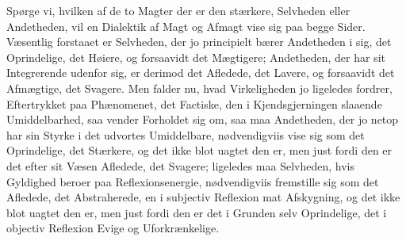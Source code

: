 \documentclass[12pt,a4paper]{book}
\begin{document}
Spørge vi, hvilken af de to Magter der er den stærkere, Selvheden eller
Andetheden, vil en Dialektik af Magt og Afmagt vise sig paa begge Sider.
Væsentlig forstaaet er Selvheden, der jo principielt bærer Andetheden i sig, det
Oprindelige, det Høiere, og forsaavidt det Mægtigere; Andetheden, der har
sit Integrerende udenfor sig, er derimod det Afledede, det Lavere, og forsaavidt
det Afmægtige, det Svagere. Men falder nu, hvad Virkeligheden jo ligeledes
fordrer, Eftertrykket paa Phænomenet, det Factiske, den i Kjendsgjerningen
slaaende Umiddelbarhed, saa vender Forholdet sig om, saa maa Andetheden, der jo
netop har sin Styrke i det udvortes Umiddelbare, nødvendigviis vise sig som det
Oprindelige, det Stærkere, og det ikke blot uagtet den er, men just fordi den er
det efter sit Væsen Afledede, det Svagere; ligeledes maa Selvheden, hvis
Gyldighed beroer paa Reflexionsenergie, nødvendigviis fremstille sig som det
Afledede, det Abstraherede, en i subjectiv Reflexion mat Afskygning, og det ikke
blot uagtet den er, men just fordi den er det i Grunden selv Oprindelige, det i
objectiv Reflexion Evige og Uforkrænkelige.
\end{document}
